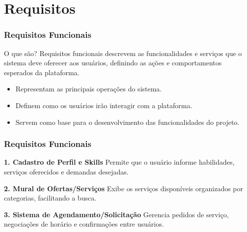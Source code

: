 \documentclass[aspectratio=169]{beamer}
\begin{document}
\section[Requisitos]{Requisitos}
\begin{frame}
\frametitle{Requisitos Funcionais}

\begin{block}{O que são?}
Requisitos funcionais descrevem as funcionalidades e serviços que o sistema deve oferecer aos usuários, definindo as ações e comportamentos esperados da plataforma.
\end{block}

\begin{itemize}
\item Representam as principais operações do sistema.

\item Definem como os usuários irão interagir com a plataforma.

\item Servem como base para o desenvolvimento das funcionalidades do projeto.

\end{itemize}

\end{frame}


\begin{frame}
\frametitle{Requisitos Funcionais}

\small

\textbf{1. Cadastro de Perfil e Skills}
Permite que o usuário informe habilidades, serviços oferecidos e demandas desejadas.

\vspace{0.3cm}

\textbf{2. Mural de Ofertas/Serviços}
Exibe os serviços disponíveis organizados por categorias, facilitando a busca.

\vspace{0.3cm}

\textbf{3. Sistema de Agendamento/Solicitação}
Gerencia pedidos de serviço, negociações de horário e confirmações entre usuários.

\end{frame}

\end{document}
